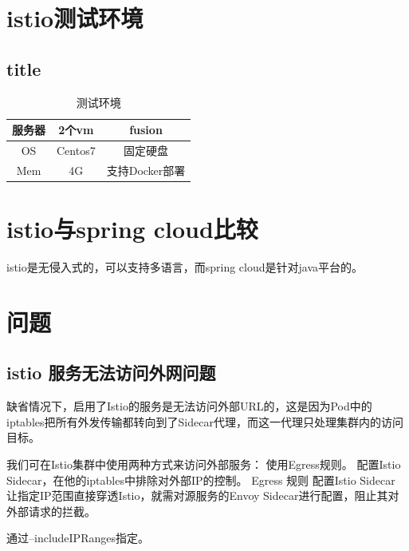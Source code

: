 \documentclass{ctexart}
\begin{document}
\section{istio测试环境}
\subsection{title}


\begin{table}[h]
	\centering
	\caption{测试环境}\label{tab:tab1}
	\begin{tabular}{|c|c|c|}
		\hline
		服务器 & 2个vm & fusion \\\hline
		OS & Centos7 & 固定硬盘 \\\hline
		Mem & 4G  & 支持Docker部署 \\
		\hline
	\end{tabular}
\end{table}


\section{istio与spring cloud比较}
istio是无侵入式的，可以支持多语言，而spring cloud是针对java平台的。

\section{问题}

\subsection{istio 服务无法访问外网问题}
缺省情况下，启用了Istio的服务是无法访问外部URL的，这是因为Pod中的iptables把所有外发传输都转向到了Sidecar代理，而这一代理只处理集群内的访问目标。

我们可在Istio集群中使用两种方式来访问外部服务：
使用Egress规则。
配置Istio Sidecar，在他的iptables中排除对外部IP的控制。 
Egress 规则
配置Istio Sidecar 
让指定IP范围直接穿透Istio，就需对源服务的Envoy Sidecar进行配置，阻止其对外部请求的拦截。

通过--includeIPRanges指定。


\end{document}
